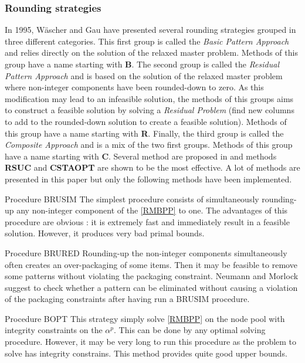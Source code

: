 \subsubsection{Rounding strategies}

In 1995, Wäscher and Gau have presented several rounding strategies grouped in three different categories. This first group is called the \textit{Basic Pattern Approach} and relies directly on the solution of the relaxed master problem. Methods of this group have a name starting with \textbf{B}. The second group is called the \textit{Residual Pattern Approach} and is based on the solution of the relaxed master problem where non-integer components have been rounded-down to zero. As this modification may lead to an infeasible solution, the methods of this groups aims to construct a feasible solution by solving a \textit{Residual Problem} (find new columns to add to the rounded-down solution to create a feasible solution).  Methods of this group have a name starting with \textbf{R}. Finally, the third group is called the \textit{Composite Approach} and is a mix of the two first groups.  Methods of this group have a name starting with \textbf{C}. Several method are proposed in \cite{wascher1996heuristics} and methods \textbf{RSUC} and \textbf{CSTAOPT} are shown to be the most effective. A lot of methods are presented in this paper but only the following methods have been implemented.

\begin{paragraph}{Procedure BRUSIM}
	The simplest procedure consists of simultaneously rounding-up any non-integer component of the \eqref{RMBPP} to one. The advantages of this procedure are obvious : it is extremely fast and immediately result in a feasible solution. However, it produces very bad primal bounds.
\end{paragraph}

\begin{paragraph}{Procedure BRURED}
	Rounding-up the non-integer components simultaneously often creates an over-packaging of some items. Then it may be feasible to remove some patterns without violating the packaging constraint. Neumann and Morlock \cite{bankhofer2000quantitative} suggest to check whether a pattern can be eliminated without causing a violation of the packaging constraints after having run a BRUSIM procedure.
\end{paragraph}

\begin{paragraph}{Procedure BOPT}
	This strategy simply solve \eqref{RMBPP} on the node pool with integrity constraints on the $\alpha^p$. This can be done by any optimal solving procedure. However, it may be very long to run this procedure as the problem to solve has integrity constrains. This method provides quite good upper bounds.
\end{paragraph}

